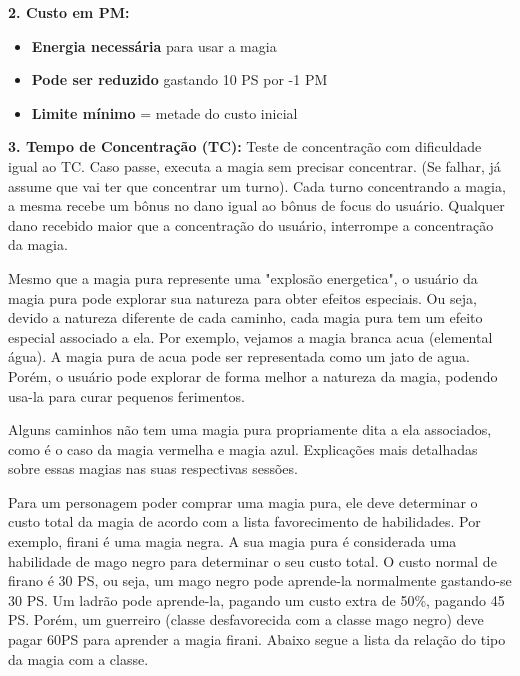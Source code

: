 \textbf{2. Custo em PM:}
\begin{itemize}
    \item \textbf{Energia necessária} para usar a magia
    \item \textbf{Pode ser reduzido} gastando 10 PS por -1 PM
    \item \textbf{Limite mínimo} = metade do custo inicial
\end{itemize}

\textbf{3. Tempo de Concentração (TC):}
Teste de concentração com dificuldade igual ao TC. Caso passe, executa a magia sem precisar concentrar. (Se falhar, já assume que vai ter que concentrar um turno). Cada turno concentrando a magia, a mesma recebe um bônus no dano igual ao bônus de focus do usuário. Qualquer dano recebido maior que a concentração do usuário, interrompe a concentração da magia.

Mesmo que a magia pura represente uma "explosão energetica", o usuário da magia pura pode explorar sua natureza para obter efeitos especiais. Ou seja, devido a natureza diferente de cada caminho, cada magia pura tem um efeito especial associado a ela. Por exemplo, vejamos a magia branca acua (elemental água). A magia pura de acua pode ser representada como um jato de agua. Porém, o usuário pode explorar de forma melhor a natureza da magia, podendo usa-la para curar pequenos ferimentos.

Alguns caminhos não tem uma magia pura propriamente dita a ela associados, como é o caso da magia vermelha e magia azul. Explicações mais detalhadas sobre essas magias nas suas respectivas sessões.

Para um personagem poder comprar uma magia pura, ele deve determinar o custo total da magia de acordo com a lista favorecimento de habilidades. Por exemplo, firani é uma magia negra. A sua magia pura é considerada uma habilidade de mago negro para determinar o seu custo total. O custo normal de firano é 30 PS, ou seja, um mago negro pode aprende-la normalmente gastando-se 30 PS. Um ladrão pode aprende-la, pagando um custo extra de 50\%, pagando 45 PS. Porém, um guerreiro (classe desfavorecida com a classe mago negro) deve pagar 60PS para aprender a magia firani. Abaixo segue a lista da relação do tipo da magia com a classe.

